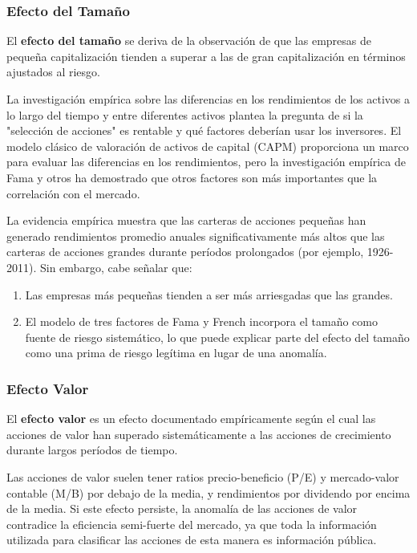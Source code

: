\subsubsection{Efecto del Tamaño}

\begin{definicion}
El \textbf{efecto del tamaño} se deriva de la observación de que las empresas de pequeña capitalización tienden a superar a las de gran capitalización en términos ajustados al riesgo.
\end{definicion}

La investigación empírica sobre las diferencias en los rendimientos de los activos a lo largo del tiempo y entre diferentes activos plantea la pregunta de si la "selección de acciones" es rentable y qué factores deberían usar los inversores. El modelo clásico de valoración de activos de capital (CAPM) proporciona un marco para evaluar las diferencias en los rendimientos, pero la investigación empírica de Fama y otros ha demostrado que otros factores son más importantes que la correlación con el mercado.

La evidencia empírica muestra que las carteras de acciones pequeñas han generado rendimientos promedio anuales significativamente más altos que las carteras de acciones grandes durante períodos prolongados (por ejemplo, 1926-2011). Sin embargo, cabe señalar que:

\begin{enumerate}
\item Las empresas más pequeñas tienden a ser más arriesgadas que las grandes.
\item El modelo de tres factores de Fama y French incorpora el tamaño como fuente de riesgo sistemático, lo que puede explicar parte del efecto del tamaño como una prima de riesgo legítima en lugar de una anomalía.
\end{enumerate}

\subsubsection{Efecto Valor}

\begin{definicion}
El \textbf{efecto valor} es un efecto documentado empíricamente según el cual las acciones de valor han superado sistemáticamente a las acciones de crecimiento durante largos períodos de tiempo.
\end{definicion}

Las acciones de valor suelen tener ratios precio-beneficio (P/E) y mercado-valor contable (M/B) por debajo de la media, y rendimientos por dividendo por encima de la media. Si este efecto persiste, la anomalía de las acciones de valor contradice la eficiencia semi-fuerte del mercado, ya que toda la información utilizada para clasificar las acciones de esta manera es información pública.

